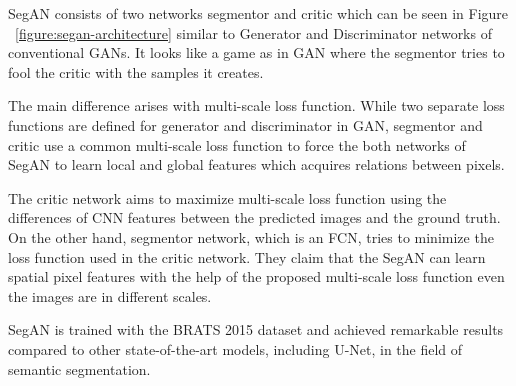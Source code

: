         SegAN consists of two networks segmentor and critic which can be seen in Figure ~\ref{figure:segan-architecture} similar to Generator and Discriminator networks of conventional GANs.
        It looks like a game as in GAN where the segmentor tries to fool the critic with the samples it creates.

        

        The main difference arises with multi-scale loss function. While two separate loss functions are defined for generator and discriminator in GAN,
        segmentor and critic use a common multi-scale loss function to force the both networks of SegAN to learn local and global features which acquires relations between pixels.

        The critic network aims to maximize multi-scale loss function using the differences of CNN features between the predicted images and the ground truth.
        On the other hand, segmentor network, which is an FCN, tries to minimize the loss function used in the critic network.
        They claim that the SegAN can learn spatial pixel features with the help of the proposed multi-scale loss function even the images are in different scales.

        SegAN is trained with the BRATS 2015 dataset and achieved remarkable results compared to other state-of-the-art models, including U-Net, in the field of semantic segmentation.
